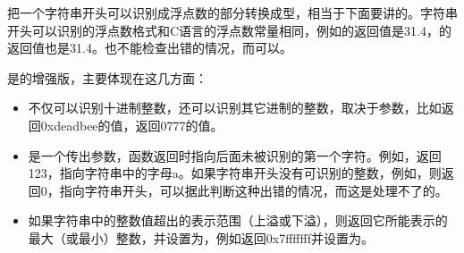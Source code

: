 把一个字符串开头可以识别成浮点数的部分转换成型，相当于下面要讲的。字符串开头可以识别的浮点数格式和C语言的浮点数常量相同，例如的返回值是31.\BookSplit{}4，的返回值也是31.\BookSplit{}4。也不能检查出错的情况，而可以。




是的增强版，主要体现在这几方面：


\begin{itemize}

\item 不仅可以识别十进制整数，还可以识别其它进制的整数，取决于参数，比如返回0xdeadbee的值，返回0777的值。

\item {}是一个传出参数，函数返回时指向后面未被识别的第一个字符。例如，返回123，指向字符串中的字母a。如果字符串开头没有可识别的整数，例如，则返回0，指向字符串开头，可以据此判断这种出错的情况，而这是处理不了的。

\item 如果字符串中的整数值超出的表示范围（上溢或下溢），则返回它所能表示的最大（或最小）整数，并设置为，例如返回0x7fffffff并设置为。
\end{itemize}


